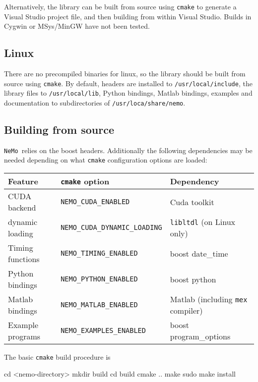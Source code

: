 \documentclass[a4paper]{article}
\newcommand{\nemo}{\texttt{NeMo}}
\newcommand{\command}[1]{\texttt{#1}}
\newcommand{\file}[1]{\texttt{#1}}
\newcommand{\directory}[1]{\texttt{#1}}
\begin{document}
Alternatively, the library can be built from source using \command{cmake} to generate a Visual Studio project file,
	and then building from within Visual Studio.
Builds in Cygwin or MSys/MinGW have not been tested.

\subsection{Linux}

There are no precompiled binaries for linux,
	so the library should be built from source using \command{cmake}.
By default,
	headers are installed to \file{/usr/local/include},
	the library files to \file{/usr/local/lib},
	Python bindings, Matlab bindings, examples and documentation to subdirectories of \directory{/usr/loca/share/nemo}.

\subsection{Building from source}

\nemo\ relies on the boost headers.
Additionally the following dependencies may be needed depending on what \command{cmake} configuration options are loaded: 

\begin{tabular}{p{}lp{}}
\hline
Feature & \command{cmake} option & Dependency \\
\hline
CUDA backend & \command{NEMO\_CUDA\_ENABLED} & Cuda toolkit \\
\hspace{2em}dynamic loading & \command{NEMO\_CUDA\_DYNAMIC\_LOADING} & \command{libltdl} (on Linux only) \\
Timing functions & \command{NEMO\_TIMING\_ENABLED} & boost date\_time \\
Python bindings & \command{NEMO\_PYTHON\_ENABLED} & boost python \\
Matlab bindings & \command{NEMO\_MATLAB\_ENABLED} & Matlab (including \command{mex} compiler) \\
Example programs & \command{NEMO\_EXAMPLES\_ENABLED} & boost program\_options \\ 
\hline
\end{tabular}


The basic \command{cmake} build procedure is 

\begin{shell}
cd <nemo-directory>
mkdir build
cd build
cmake ..
make
sudo make install
\end{shell}
\end{document}
